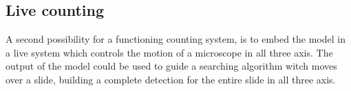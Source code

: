 \subsection*{Live counting}
A second possibility for a functioning counting system, is to embed the model in a live system which controls the motion of a microscope in all three axis.
The output of the model could be used to guide a searching algorithm witch moves over a slide, building a complete detection for the entire slide in all three axis.